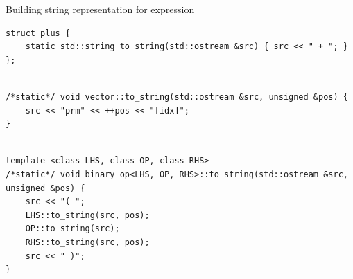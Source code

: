 \documentclass[@BEAMER_OPTIONS@]{beamer}
\begin{document}
\note{ }

\begin{frame}[fragile]{Building string representation for expression}
    \begin{exampleblock}{}
        \begin{lstlisting}
struct plus {
    static std::string to_string(std::ostream &src) { src << " + "; }
};
        \end{lstlisting}
        \pause
        \begin{lstlisting}[firstnumber=last]

/*static*/ void vector::to_string(std::ostream &src, unsigned &pos) {
    src << "prm" << ++pos << "[idx]";
}
        \end{lstlisting}
        \pause
        \begin{lstlisting}[firstnumber=last]

template <class LHS, class OP, class RHS>
/*static*/ void binary_op<LHS, OP, RHS>::to_string(std::ostream &src, unsigned &pos) {
    src << "( ";
    LHS::to_string(src, pos);
    OP::to_string(src);
    RHS::to_string(src, pos);
    src << " )";
}
        \end{lstlisting}
    \end{exampleblock}
\end{frame}

\end{document}
